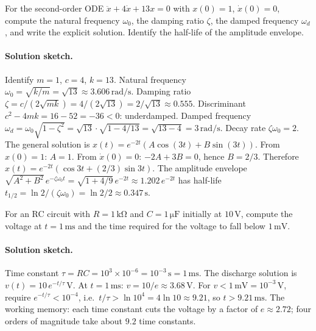 \begin{exercise}
For the second-order ODE $\ddot{x} + 4 \dot{x} + 13 x = 0$ with
$x(0) = 1$, $\dot{x}(0) = 0$, compute the natural frequency
$\omega_{0}$, the damping ratio $\zeta$, the damped frequency
$\omega_{d}$, and write the explicit solution. Identify the
half-life of the amplitude envelope.

\paragraph{Solution sketch.} Identify $m = 1$, $c = 4$, $k = 13$.
Natural frequency $\omega_{0} = \sqrt{k/m} = \sqrt{13} \approx
3.606\,\si{\radian\per\second}$. Damping ratio $\zeta = c/(2
\sqrt{m k}) = 4/(2 \sqrt{13}) = 2/\sqrt{13} \approx 0.555$.
Discriminant $c^{2} - 4 m k = 16 - 52 = -36 < 0$: underdamped.
Damped frequency $\omega_{d} = \omega_{0}\sqrt{1 - \zeta^{2}} =
\sqrt{13} \cdot \sqrt{1 - 4/13} = \sqrt{13 - 4} = 3\,\si{\radian
\per\second}$. Decay rate $\zeta \omega_{0} = 2$. The general
solution is $x(t) = e^{-2 t}(A \cos(3 t) + B \sin(3 t))$. From
$x(0) = 1$: $A = 1$. From $\dot{x}(0) = 0$: $-2 A + 3 B = 0$,
hence $B = 2/3$. Therefore $x(t) = e^{-2 t}(\cos 3 t +
(2/3) \sin 3 t)$. The amplitude envelope $\sqrt{A^{2} + B^{2}}\,
e^{-\zeta \omega_{0} t} = \sqrt{1 + 4/9}\, e^{-2 t} \approx
1.202\, e^{-2 t}$ has half-life $t_{1/2} = \ln 2 / (\zeta
\omega_{0}) = \ln 2 / 2 \approx 0.347\,\si{\second}$.
\end{exercise}

\begin{exercise}
For an RC circuit with $R = 1\,\si{\kilo\ohm}$ and $C =
1\,\si{\micro\farad}$ initially at $10\,\si{\volt}$, compute the
voltage at $t = 1\,\si{\milli\second}$ and the time required for
the voltage to fall below $1\,\si{\milli\volt}$.

\paragraph{Solution sketch.} Time constant $\tau = RC = 10^{3}
\times 10^{-6} = 10^{-3}\,\si{\second} = 1\,\si{\milli\second}$.
The discharge solution is $v(t) = 10\, e^{-t/\tau}\,\si{\volt}$.
At $t = 1\,\si{\milli\second}$: $v = 10/e \approx 3.68\,\si{
\volt}$. For $v < 1\,\si{\milli\volt} = 10^{-3}\,\si{\volt}$,
require $e^{-t/\tau} < 10^{-4}$, i.e.\ $t/\tau > \ln 10^{4} = 4
\ln 10 \approx 9.21$, so $t > 9.21\,\si{\milli\second}$. The
working memory: each time constant cuts the voltage by a factor
of $e \approx 2.72$; four orders of magnitude take about $9.2$
time constants.
\end{exercise}

